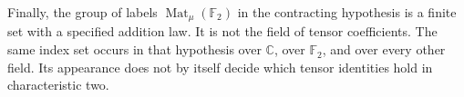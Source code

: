 Finally, the group of labels
$\operatorname{Mat}_{\mu}(\mathbb F_2)$ in the
contracting hypothesis is a finite set with a
specified addition law.  It is not the field of
tensor coefficients.  The same index set occurs
in that hypothesis over $\mathbb C$, over
$\mathbb F_2$, and over every other field.
Its appearance does not by itself decide which
tensor identities hold in characteristic two.
